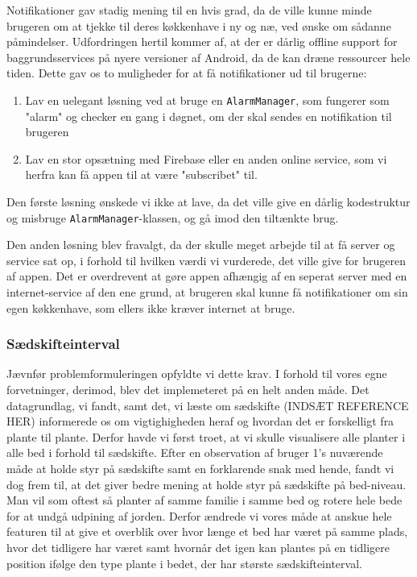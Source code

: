 Notifikationer gav stadig mening til en hvis grad, da de ville kunne minde brugeren om at tjekke til deres køkkenhave i ny og næ, ved ønske om sådanne påmindelser. Udfordringen hertil kommer af, at der er dårlig offline support for baggrundsservices på nyere versioner af Android, da de kan dræne ressourcer hele tiden. Dette gav os to muligheder for at få notifikationer ud til brugerne:

\begin{enumerate}
    \item Lav en uelegant løsning ved at bruge en \texttt{AlarmManager}, som fungerer som "alarm" og checker en gang i døgnet, om der skal sendes en notifikation til brugeren
    \item Lav en stor opsætning med Firebase eller en anden online service, som vi herfra kan få appen til at være "subscribet" til.
\end{enumerate}

Den første løsning ønskede vi ikke at lave, da det ville give en dårlig kodestruktur og misbruge \texttt{AlarmManager}-klassen, og gå imod den tiltænkte brug.

Den anden løsning blev fravalgt, da der skulle meget arbejde til at få server og service sat op, i forhold til hvilken værdi vi vurderede, det ville give for brugeren af appen. Det er overdrevent at gøre appen afhængig af en seperat server med en internet-service af den ene grund, at brugeren skal kunne få notifikationer om sin egen køkkenhave, som ellers ikke kræver internet at bruge.

\subsubsection{Sædskifteinterval}
Jævnfør problemformuleringen opfyldte vi dette krav. I forhold til vores egne forvetninger, derimod, blev det implemeteret på en helt anden måde. Det datagrundlag, vi fandt, samt det, vi læste om sædskifte (INDSÆT REFERENCE HER) informerede os om vigtighigheden heraf og hvordan det er forskelligt fra plante til plante. Derfor havde vi først troet, at vi skulle visualisere alle planter i alle bed i forhold til sædskifte. Efter en observation af bruger 1's nuværende måde at holde styr på sædskifte samt en forklarende snak med hende, fandt vi dog frem til, at det giver bedre mening at holde styr på sædskifte på bed-niveau. Man vil som oftest så planter af samme familie i samme bed og rotere hele bede for at undgå udpining af jorden. Derfor ændrede vi vores måde at anskue hele featuren til at give et overblik over hvor længe et bed har været på samme plads, hvor det tidligere har været samt hvornår det igen kan plantes på en tidligere position ifølge den type plante i bedet, der har største sædskifteinterval.

